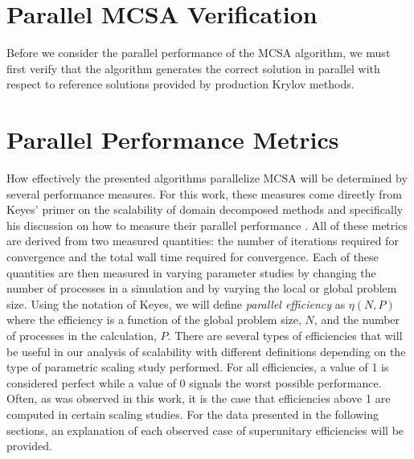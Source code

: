 \section{Parallel MCSA Verification\ }
\label{sec:parallel_verification}
Before we consider the parallel performance of the MCSA algorithm, we
must first verify that the algorithm generates the correct solution in
parallel with respect to reference solutions provided by production
Krylov methods.

\section{Parallel Performance Metrics\ }
\label{sec:parallel_performance_metrics}

How effectively the presented algorithms parallelize MCSA will be
determined by several performance measures. For this work, these
measures come directly from Keyes' primer on the scalability of domain
decomposed methods and specifically his discussion on how to measure
their parallel performance \citep{keyes_how_1999}. All of these
metrics are derived from two measured quantities: the number of
iterations required for convergence and the total wall time required
for convergence. Each of these quantities are then measured in varying
parameter studies by changing the number of processes in a simulation
and by varying the local or global problem size. Using the notation of
Keyes, we will define \textit{parallel efficiency} as $\eta(N,P)$
where the efficiency is a function of the global problem size, $N$,
and the number of processes in the calculation, $P$. There are several
types of efficiencies that will be useful in our analysis of
scalability with different definitions depending on the type of
parametric scaling study performed. For all efficiencies, a value of 1
is considered perfect while a value of 0 signals the worst possible
performance. Often, as was observed in this work, it is the case that
efficiencies above 1 are computed in certain scaling studies. For the
data presented in the following sections, an explanation of each
observed case of superunitary efficiencies will be provided.

